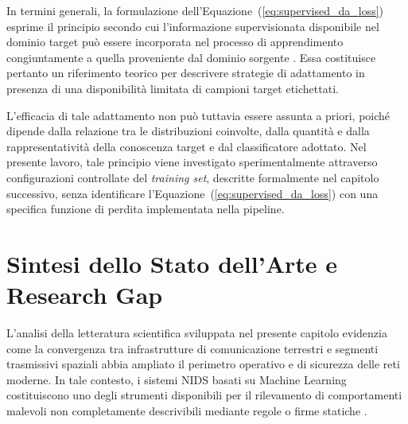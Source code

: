 In termini generali, la formulazione dell'Equazione~(\ref{eq:supervised_da_loss}) esprime il principio secondo cui l'informazione supervisionata disponibile nel dominio target può essere incorporata nel processo di apprendimento congiuntamente a quella proveniente dal dominio sorgente \cite{motiian2017}.
Essa costituisce pertanto un riferimento teorico per descrivere strategie di adattamento in presenza di una disponibilità limitata di campioni target etichettati.

L'efficacia di tale adattamento non può tuttavia essere assunta a priori, poiché dipende dalla relazione tra le distribuzioni coinvolte, dalla quantità e dalla rappresentatività della conoscenza target e dal classificatore adottato.
Nel presente lavoro, tale principio viene investigato sperimentalmente attraverso configurazioni controllate del \textit{training set}, descritte formalmente nel capitolo successivo, senza identificare l'Equazione~(\ref{eq:supervised_da_loss}) con una specifica funzione di perdita implementata nella pipeline.



\section{Sintesi dello Stato dell'Arte e Research Gap}
\label{sec:sintesi_posizionamento}

L'analisi della letteratura scientifica sviluppata nel presente capitolo evidenzia come la convergenza tra infrastrutture di comunicazione terrestri e segmenti trasmissivi spaziali abbia ampliato il perimetro operativo e di sicurezza delle reti moderne. 
In tale contesto, i sistemi NIDS basati su Machine Learning costituiscono uno degli strumenti disponibili per il rilevamento di comportamenti malevoli non completamente descrivibili mediante regole o firme statiche \cite{khraisat2019,hindy2020}.

